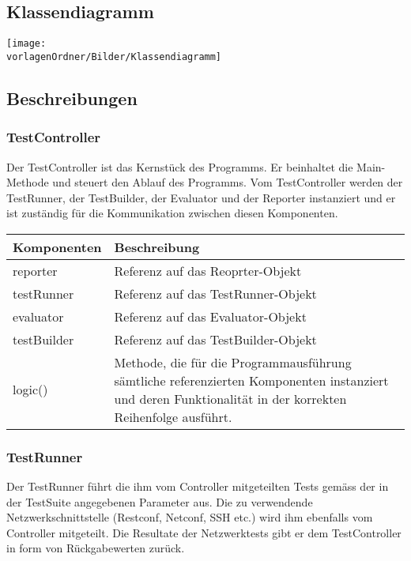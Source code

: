 \documentclass[
	ngerman,
	toc=listof, %
	toc=bibliography, %
	footnotes=multiple, %
	parskip=half, %
	numbers=noendperiod %
]{scrartcl}
\newcommand{\vorlagenOrdner}{../../99_Vorlagen} %
\begin{document}
\begin{landscape}
	\section{Klassendiagramm}
	\texttt{[image: \\vorlagenOrdner/Bilder/Klassendiagramm]}
	\newpage	
\end{landscape}


	\subsection{Beschreibungen}

	\subsubsection{TestController}
	Der TestController ist das Kernstück des Programms. 
	Er beinhaltet die Main-Methode und steuert den Ablauf des Programms. 
	Vom TestController werden der TestRunner, der TestBuilder, der Evaluator und der Reporter instanziert und er ist zuständig für die Kommunikation zwischen diesen Komponenten.
	
	\begin{tabularx}{\textwidth}{lX}
		\toprule
			Komponenten & Beschreibung \\
		\midrule
			reporter & Referenz auf das Reoprter-Objekt \\
			testRunner & Referenz auf das TestRunner-Objekt \\
			evaluator & Referenz auf das Evaluator-Objekt \\
			testBuilder & Referenz auf das TestBuilder-Objekt \\
		\midrule
			logic() & Methode, die für die Programmausführung sämtliche referenzierten Komponenten instanziert und deren Funktionalität in der korrekten Reihenfolge ausführt.\\
		\bottomrule
	\end{tabularx}

	\subsubsection{TestRunner}
	Der TestRunner führt die ihm vom Controller mitgeteilten Tests gemäss der in der TestSuite angegebenen Parameter aus. 
	Die zu verwendende Netzwerkschnittstelle (Restconf, Netconf, SSH etc.) wird ihm ebenfalls vom Controller mitgeteilt.
	Die Resultate der Netzwerktests gibt er dem TestController in form von Rückgabewerten zurück.
\end{document}
